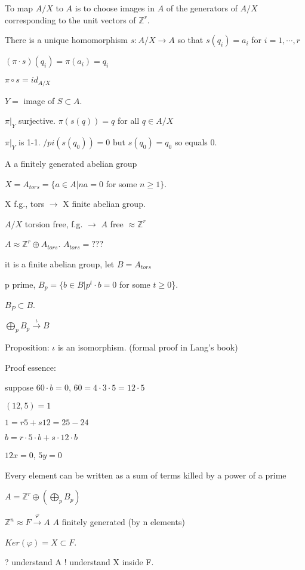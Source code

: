 \documentclass[12pt]{article}
\begin{document}
To map $A/X$ to $A$ is to choose images in $A$ of the generators of $A/X$ corresponding to the unit vectors of $\mathds{Z}^r$.

There is a unique homomorphism $s: A/X \to A$ so that $s(q_i) = a_i$ for $i = 1, \cdots, r$

$(\pi \cdot s)(q_i) = \pi(a_i) = q_i$

$\pi \circ s = id_{A/X}$

$Y =$ image of $S \subset A$.

$\pi|_Y$ surjective.  $\pi(s(q)) = q$ for all $q \in A/X$

$\pi|_Y$ is 1-1.  $/pi(s(q_0)) = 0$ but $s(q_0) = q_0$ so equals 0.

\noindent
A a finitely generated abelian group

$X = A_{tors} = \{a \in A | na = 0$ for some $n \geq 1\}$.

X f.g., tors $\to$ X finite abelian group.

$A/X$ torsion free, f.g. $\to$ $A$ free $\approx \mathds{Z}^r$

\noindent
$A \approx \mathds{Z}^r \oplus A_{tors}$.  $A_{tors} = ???$

it is a finite abelian group, let $B = A_{tors}$

p prime, $B_p = \{b \in B | p^t \cdot b = 0$ for some $t \geq 0$\}.

$B_P \subset B$.

$\bigoplus_p B_p \xrightarrow{\iota} B$

Proposition: $\iota$ is an isomorphism. (formal proof in Lang's book)

\noindent
Proof essence:

suppose $60 \cdot b = 0$, $60 = 4 \cdot 3 \cdot 5 = 12 \cdot 5$

$(12, 5) = 1$

$1 = r5 + s12 = 25 - 24$

$b = r \cdot 5 \cdot b + s \cdot 12 \cdot b$

$12x = 0$, $5y = 0$

Every element can be written as a sum of terms killed by a power of a prime

\noindent
$A = \mathds{Z}^r \oplus (\bigoplus_p B_p)$

\noindent
$\mathds{Z}^n \approx F \xrightarrow{\varphi} A$ $A$ finitely generated (by n elements)

$Ker(\varphi) = X \subset F$.

? understand A ! understand X inside F.
\end{document}
